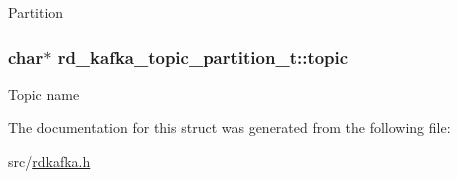 Partition \hypertarget{structrd__kafka__topic__partition__t_a981a6411337ecf5d95e6ab48d1071177}{
\subsubsection[{topic}]{\setlength{\rightskip}{0pt plus 5cm}char$\ast$ rd\-\_\-kafka\-\_\-topic\-\_\-partition\-\_\-t\-::topic}}\label{structrd__kafka__topic__partition__t_a981a6411337ecf5d95e6ab48d1071177}
Topic name 

The documentation for this struct was generated from the following file\-:\begin{DoxyCompactItemize}
\item 
src/\hyperlink{rdkafka_8h}{rdkafka.\-h}\end{DoxyCompactItemize}

